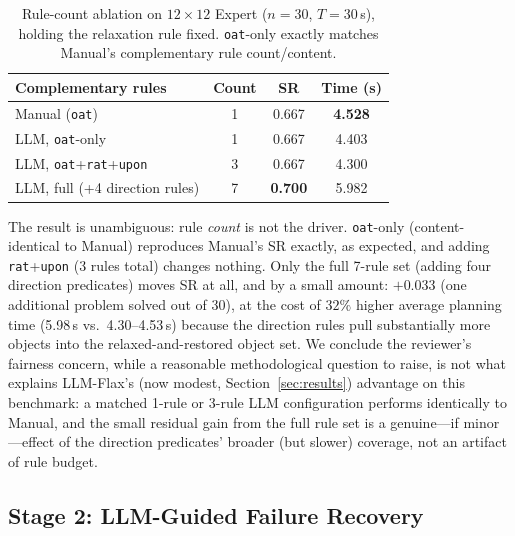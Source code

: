 \documentclass[letterpaper, 10pt, journal, twoside]{IEEEtran}
\newcommand{\sref}[1]{Section~\ref{#1}}
\newcommand{\method}{LLM-Flax\xspace}
\begin{document}
\begin{table}[t]
    \centering
    \caption{Rule-count ablation on $12{\times}12$ Expert ($n{=}30$, $T{=}30$\,s), holding the relaxation rule fixed. \texttt{oat}-only exactly matches Manual's complementary rule count/content.}
    \label{tab:rulecount}
    \small
    \setlength{\tabcolsep}{4pt}
    \renewcommand{\arraystretch}{1.1}
    \begin{tabular}{lccc}
        \toprule
        \textbf{Complementary rules} & \textbf{Count} & \textbf{SR} & \textbf{Time (s)} \\
        \midrule
        Manual (\texttt{oat})                          & 1 & 0.667          & \textbf{4.528} \\
        LLM, \texttt{oat}-only                         & 1 & 0.667          & 4.403 \\
        LLM, \texttt{oat}+\texttt{rat}+\texttt{upon}    & 3 & 0.667          & 4.300 \\
        LLM, full (+4 direction rules)                 & 7 & \textbf{0.700} & 5.982 \\
        \bottomrule
    \end{tabular}
\end{table}

The result is unambiguous: rule \emph{count} is not the driver.
\texttt{oat}-only (content-identical to Manual) reproduces Manual's SR exactly, as expected, and adding \texttt{rat}+\texttt{upon} (3 rules total) changes nothing.
Only the full 7-rule set (adding four direction predicates) moves SR at all, and by a small amount: $+0.033$ (one additional problem solved out of 30), at the cost of $32\%$ higher average planning time (5.98\,s vs.\ 4.30--4.53\,s) because the direction rules pull substantially more objects into the relaxed-and-restored object set.
We conclude the reviewer's fairness concern, while a reasonable methodological question to raise, is not what explains \method's (now modest, \sref{sec:results}) advantage on this benchmark: a matched 1-rule or 3-rule LLM configuration performs identically to Manual, and the small residual gain from the full rule set is a genuine---if minor---effect of the direction predicates' broader (but slower) coverage, not an artifact of rule budget.

\subsection{Stage 2: LLM-Guided Failure Recovery}
\label{sec:results_stage2}
\end{document}
